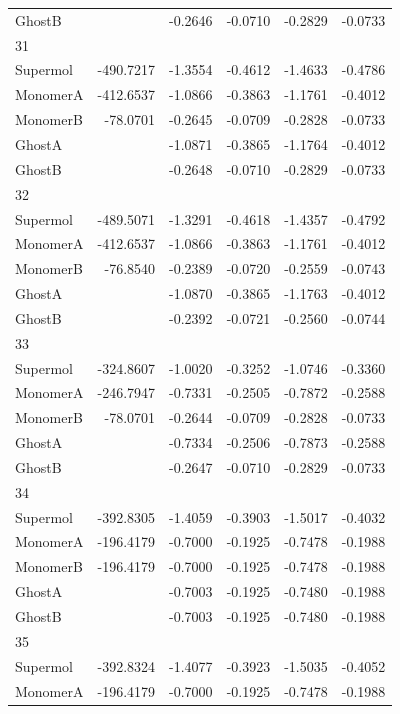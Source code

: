 \documentclass[journal=jctcce,manuscript=article]{achemso}
\begin{document}
\begin{spacing}{1}
\begin{longtable}{lRRRRR}
    GhostB &  & -0.2646 & -0.0710 & -0.2829 & -0.0733 \\
    31 &  &  &  &  &  \\
    Supermol & -490.7217 & -1.3554 & -0.4612 & -1.4633 & -0.4786 \\
    MonomerA & -412.6537 & -1.0866 & -0.3863 & -1.1761 & -0.4012 \\
    MonomerB & -78.0701 & -0.2645 & -0.0709 & -0.2828 & -0.0733 \\
    GhostA &  & -1.0871 & -0.3865 & -1.1764 & -0.4012 \\
    GhostB &  & -0.2648 & -0.0710 & -0.2829 & -0.0733 \\
    32 &  &  &  &  &  \\
    Supermol & -489.5071 & -1.3291 & -0.4618 & -1.4357 & -0.4792 \\
    MonomerA & -412.6537 & -1.0866 & -0.3863 & -1.1761 & -0.4012 \\
    MonomerB & -76.8540 & -0.2389 & -0.0720 & -0.2559 & -0.0743 \\
    GhostA &  & -1.0870 & -0.3865 & -1.1763 & -0.4012 \\
    GhostB &  & -0.2392 & -0.0721 & -0.2560 & -0.0744 \\
    33 &  &  &  &  &  \\
    Supermol & -324.8607 & -1.0020 & -0.3252 & -1.0746 & -0.3360 \\
    MonomerA & -246.7947 & -0.7331 & -0.2505 & -0.7872 & -0.2588 \\
    MonomerB & -78.0701 & -0.2644 & -0.0709 & -0.2828 & -0.0733 \\
    GhostA &  & -0.7334 & -0.2506 & -0.7873 & -0.2588 \\
    GhostB &  & -0.2647 & -0.0710 & -0.2829 & -0.0733 \\
    34 &  &  &  &  &  \\
    Supermol & -392.8305 & -1.4059 & -0.3903 & -1.5017 & -0.4032 \\
    MonomerA & -196.4179 & -0.7000 & -0.1925 & -0.7478 & -0.1988 \\
    MonomerB & -196.4179 & -0.7000 & -0.1925 & -0.7478 & -0.1988 \\
    GhostA &  & -0.7003 & -0.1925 & -0.7480 & -0.1988 \\
    GhostB &  & -0.7003 & -0.1925 & -0.7480 & -0.1988 \\
    35 &  &  &  &  &  \\
    Supermol & -392.8324 & -1.4077 & -0.3923 & -1.5035 & -0.4052 \\
    MonomerA & -196.4179 & -0.7000 & -0.1925 & -0.7478 & -0.1988 \\

\end{longtable}
\end{spacing}
\end{document}
